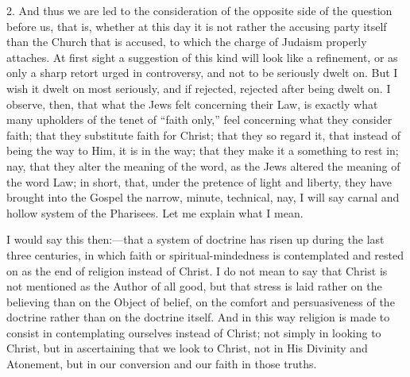 2. And thus we are led to the consideration of the opposite side of
the question before us, that is, whether at this day it is not rather
the accusing party itself than the Church that is accused, to which
the charge of Judaism properly attaches. At first sight a suggestion
of this kind will look like a refinement, or as only a sharp retort
urged in controversy, and not to be seriously dwelt on. But I wish it
dwelt on most seriously, and if rejected, rejected after being dwelt
on. I observe, then, that what the Jews felt concerning their Law, is
exactly what many upholders of the tenet of ``faith only,''
feel concerning what they consider faith; that they substitute faith
for Christ; that they so regard it, that instead of being the way to
Him, it is in the way; that they make it a something to rest in; nay,
that they alter the meaning of the word, as the Jews altered the
meaning of the word Law; in short, that, under the pretence of light
and liberty, they have brought into the Gospel the narrow, minute,
technical, nay, I will say carnal and hollow system of the Pharisees.
Let me explain what I mean.

I would say this then:—that a system of doctrine has risen up
during the last three centuries, in which faith or
spiritual-mindedness is contemplated and rested on as the end of
religion instead of Christ. I do not mean to say that Christ is not
mentioned as the Author of all good, but that stress is laid rather on
the believing than on the Object of belief, on the comfort and
persuasiveness of the doctrine rather than on the doctrine itself. And
in this way religion is made to consist in contemplating ourselves
instead of Christ; not simply in looking to Christ, but in
ascertaining that we look to Christ, not in His Divinity and
Atonement, but in our conversion and our faith in those truths.

